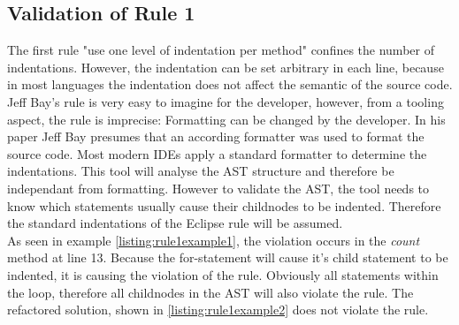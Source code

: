  
 
 
 
 
  

\subsection*{Validation of Rule 1}
The first rule "use one level of indentation per method" confines the number of indentations. However, the indentation can be set arbitrary in each line, because in most languages the indentation does not affect the semantic of the source code. Jeff Bay's rule is very easy to imagine for the developer, however, from a tooling aspect, the rule is imprecise: Formatting can be changed by the developer. In his paper Jeff Bay presumes that an according formatter was used to format the source code. Most modern \acf{IDE}s apply a standard formatter to determine the indentations. This tool will analyse the \acf{AST} structure and therefore be independant from formatting. However to validate the \acf{AST}, the tool needs to know which statements usually cause their childnodes to be indented. Therefore the standard indentations of the Eclipse rule will be assumed.
\\

As seen in example \ref{listing:rule1example1}, the violation occurs in the \textit{count} method at line 13. Because the for-statement will cause it's child statement to be indented, it is causing the violation of the rule. Obviously all statements within the loop, therefore all childnodes in the \acf{AST} will also violate the rule. The refactored solution, shown in \ref{listing:rule1example2} does not violate the rule. 
\\

